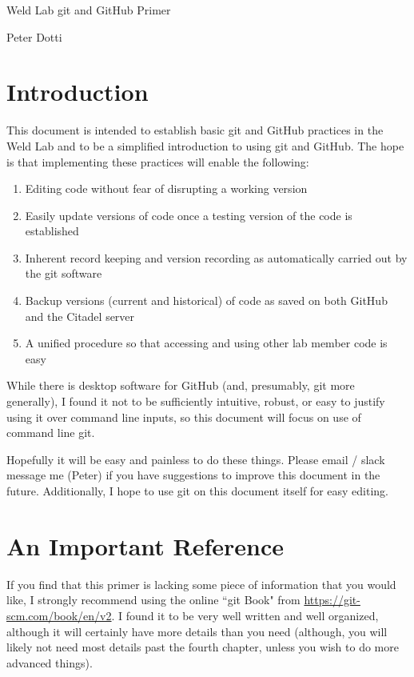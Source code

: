 \documentclass[11pt]{article}
\begin{document}
\begin{center}
{\Large Weld Lab git and GitHub Primer}

Peter Dotti
\end{center}

\section{Introduction}

This document is intended to establish basic git and GitHub practices in the Weld Lab and to be a simplified introduction to using git and GitHub.  The hope is that implementing these practices will enable the following:

\begin{enumerate}
\item Editing code without fear of disrupting a working version
\item Easily update versions of code once a testing version of the code is established
\item Inherent record keeping and version recording as automatically carried out by the git software
\item Backup versions (current and historical) of code as saved on both GitHub and the Citadel server
\item A unified procedure so that accessing and using other lab member code is easy
\end{enumerate}

While there is desktop software for GitHub (and, presumably, git more generally), I found it not to be sufficiently intuitive, robust, or easy to justify using it over command line inputs, so this document will focus on use of command line git.

Hopefully it will be easy and painless to do these things.  Please email / slack message me (Peter) if you have suggestions to improve this document in the future.  Additionally, I hope to use git on this document itself for easy editing.

\section{An Important Reference}

If you find that this primer is lacking some piece of information that you would like, I strongly recommend using the online ``git Book" from \url{https://git-scm.com/book/en/v2}.  I found it to be very well written and well organized, although it will certainly have more details than you need (although, you will likely not need most details past the fourth chapter, unless you wish to do more advanced things).
\end{document}
